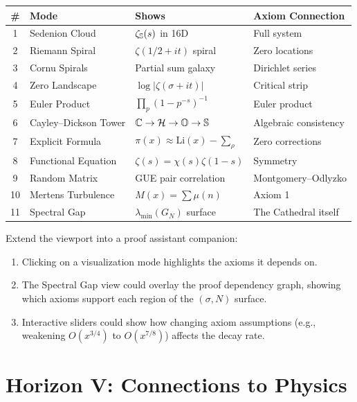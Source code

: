 \documentclass[11pt,a4paper]{article}
\begin{document}
\begin{center}
\small
\begin{tabular}{@{}clll@{}}
\toprule
\textbf{\#} & \textbf{Mode} & \textbf{Shows} & \textbf{Axiom Connection} \\
\midrule
1 & Sedenion Cloud & $\zeta_{\mathbb{S}}(s)$ in 16D & Full system \\
2 & Riemann Spiral & $\zeta(1/2+it)$ spiral & Zero locations \\
3 & Cornu Spirals & Partial sum galaxy & Dirichlet series \\
4 & Zero Landscape & $\log|\zeta(\sigma+it)|$ & Critical strip \\
5 & Euler Product & $\prod_p (1-p^{-s})^{-1}$ & Euler product \\
6 & Cayley--Dickson Tower & $\mathbb{C} \to \mathcal{H} \to \mathbb{O} \to \mathbb{S}$ & Algebraic consistency \\
7 & Explicit Formula & $\pi(x) \approx \mathrm{Li}(x) - \sum_\rho$ & Zero corrections \\
8 & Functional Equation & $\zeta(s) = \chi(s)\zeta(1-s)$ & Symmetry \\
9 & Random Matrix & GUE pair correlation & Montgomery--Odlyzko \\
10 & Mertens Turbulence & $M(x) = \sum \mu(n)$ & Axiom 1 \\
11 & Spectral Gap & $\lambda_{\min}(G_N)$ surface & The Cathedral itself \\
\bottomrule
\end{tabular}
\end{center}

\begin{direction}
Extend the viewport into a proof assistant companion:
\begin{enumerate}
  \item Clicking on a visualization mode highlights the axioms it depends on.
  \item The Spectral Gap view could overlay the proof dependency graph,
    showing which axioms support each region of the $(\sigma, N)$ surface.
  \item Interactive sliders could show how changing axiom assumptions
    (e.g., weakening $O(x^{3/4})$ to $O(x^{7/8})$) affects the decay
    rate.
\end{enumerate}
\end{direction}

\section{Horizon V: Connections to Physics}
\label{sec:physics}
\end{document}
